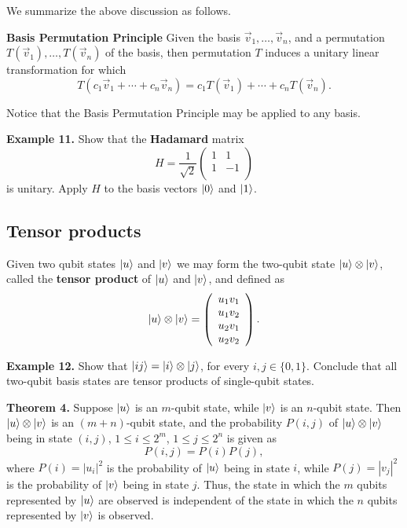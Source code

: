 \documentclass [12pt]{article}
\theoremstyle{definition}
\begin{document}
We summarize the above discussion as follows.

\textbf{Basis Permutation Principle} Given the basis $\vec{v}_1,\ldots,\vec{v}_n$, and a permutation  $T(\vec{v}_1),\ldots,T(\vec{v}_n)$ of the basis, then
permutation $T$ induces a unitary linear transformation for which 
\[T(c_1\vec{v}_1 + \cdots + c_n\vec{v}_n) = c_1T(\vec{v}_1) + \cdots + c_nT(\vec{v}_n).\]

Notice that the Basis Permutation Principle may be applied to any basis.

\newpage
\textbf{Example 11.} Show that the \textbf{Hadamard} matrix
\[H=
\frac{1}{\sqrt{2}}\left(\begin{array}{cc}
1 & 1\\
1 & -1 \\
\end{array}\right)\]
is unitary. Apply $H$ to the basis vectors $\ket{0}$ and $\ket{1}$.





\newpage
\subsection*{Tensor products}
Given two qubit states $\ket{u}$ and $\ket{v}$ we may form the two-qubit state $\ket{u}\otimes\ket{v}$, called the \textbf{tensor product} of $\ket{u}$ and $\ket{v}$,
and defined as
\[\ket{u}\otimes\ket{v}
=\left(\begin{array}{c}
u_1v_1\\
u_1v_2 \\
u_2v_1 \\
u_2v_2 \\
\end{array}\right).
\]

\newpage
\textbf{Example 12.} Show that $\ket{ij} = \ket{i}\otimes \ket{j}$, for every $i,j\in\{0,1\}$. Conclude that all two-qubit basis states are tensor products of
single-qubit states.

\newpage
\textbf{Theorem 4.} Suppose $\ket{u}$ is an $m$-qubit state, while $\ket{v}$ is an $n$-qubit state. Then $\ket{u}\otimes\ket{v}$ is an $(m+n)$-qubit state, and the 
probability $P(i,j)$  of $\ket{u}\otimes\ket{v}$ being in state $(i,j)$, $1\leq i\leq 2^m$, $1\leq j\leq 2^n$ is given as 
\[P(i,j)=P(i)P(j),\]
where $P(i)=|u_i|^2$ is the probability of  $\ket{u}$ being in state $i$, while 
$P(j)=|v_j|^2$ is the probability of  $\ket{v}$ being in state $j$. Thus, the state in which the $m$ qubits represented by $\ket{u}$ are observed is
 independent of the state in which the $n$ qubits represented by $\ket{v}$
is observed.
\end{document}
